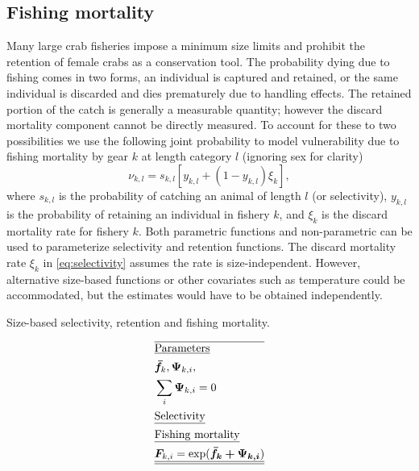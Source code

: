 \documentclass[12pt,letterpaper]{article}
\newcounter{saveEq}
\def\putEq{\setcounter{saveEq}{\value{equation}}}
\def\getEq{\setcounter{equation}{\value{saveEq}}}
\def\tableEq{ %
    \putEq \setcounter{equation}{0}
    \renewcommand{\theequation}{T\arabic{table}.\arabic{equation}}
    \vspace{-5mm}
    }
\def\normalEq{ %
    \getEq
    \renewcommand{\theequation}{\arabic{section}.\arabic{equation}}}
\begin{document}

    \subsection*{Fishing mortality} %
    \label{sub:fishing_mortality}

    Many large crab fisheries impose a minimum size limits and prohibit the retention of female crabs as a conservation tool.  The probability dying due to fishing comes in two forms, an individual is captured and retained, or the same individual is discarded and dies prematurely due to handling effects.  The retained portion of the catch is generally a measurable quantity; however the discard mortality component cannot be directly measured.  To account for these to two possibilities we use the following joint probability to model vulnerability due to fishing mortality by gear $k$ at length category $l$ (ignoring sex for clarity)
    \begin{equation}\label{eq:selectivity}
      \nu_{k,l}  = s_{k,l} [y_{k,l} + (1-y_{k,l})\xi_{k}],
    \end{equation}
    where $s_{k,l}$ is the probability of catching an animal of length $l$ (or selectivity), $y_{k,l}$ is the probability of retaining an individual in fishery $k$, and $\xi_{k}$ is the discard mortality rate for fishery $k$.  Both parametric functions and non-parametric can be used to parameterize selectivity and retention functions. The discard mortality rate $\xi_k$ in \eqref{eq:selectivity} assumes the rate is size-independent.  However, alternative size-based functions or other covariates such as temperature could be accommodated, but the estimates would have to be obtained independently.

    \begin{table}
      \centering
      \caption{Size-based selectivity, retention and fishing mortality.}
      \label{tab:fishing_mortality}
      \tableEq
      \begin{align}
      \hline \nonumber
      &\mbox{\underline{Parameters}} \nonumber \\
      & \bm{\bar{f}}_k,\bm{\Psi}_{k,i}, \\
      & \sum_i \bm\Psi_{k,i} = 0 \\
      &\mbox{\underline{Selectivity}} \nonumber \\
      &\mbox{\underline{Fishing mortality}} \nonumber \\
      & \bm{F}_{k,i} = \exp(\bm{\bar{f}_k + \bm{\Psi_{k,i}}})\\
      \hline \hline \nonumber
      \end{align}
      \normalEq
    \end{table}




%
%

  
  
  
\end{document}

